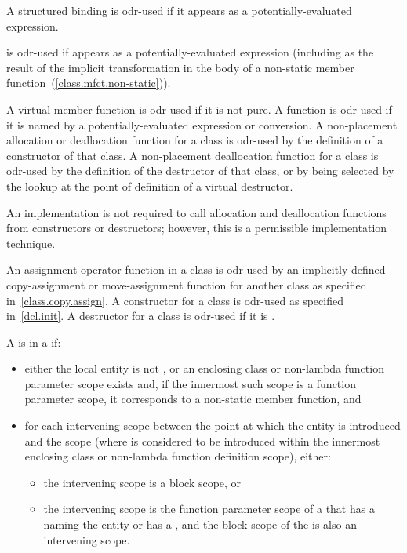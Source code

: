 \pnum
A structured binding is odr-used if it appears as a potentially-evaluated expression.

\pnum
{} is odr-used if  appears as a potentially-evaluated expression
(including as the result of the implicit transformation in the body of a non-static
member function~(\ref{class.mfct.non-static})).

\pnum
A virtual member
function is odr-used if it is not pure.
A function is odr-used if it is named by
a potentially-evaluated expression or conversion.
A non-placement allocation or deallocation
function for a class is odr-used by the definition of a constructor of that
class. A non-placement deallocation function for a class is odr-used by the
definition of the destructor of that class, or by being selected by the
lookup at the point of definition of a virtual
destructor.
\begin{footnote}
An implementation is not required
to call allocation and
deallocation functions from constructors or destructors; however, this
is a permissible implementation technique.
\end{footnote}

\pnum
An assignment operator function in a class is odr-used by an
implicitly-defined
copy-assignment or move-assignment function for another class as specified
in~\ref{class.copy.assign}.
A constructor for a class is odr-used as specified
in~\ref{dcl.init}. A destructor for a class is odr-used if it is
.

\pnum
A 
is  in a  if:
\begin{itemize}
\item either the local entity is not , or
an enclosing class or non-lambda function parameter scope exists and,
if the innermost such scope is a function parameter scope,
it corresponds to a non-static member function, and
\item
for each intervening scope
between the point at which the entity is introduced and the scope
(where  is considered to be introduced
within the innermost enclosing class or non-lambda function definition scope),
either:
\begin{itemize}
\item the intervening scope is a block scope, or
\item the intervening scope is the function parameter scope of a 
that has a 
naming the entity or has a , and
the block scope of the 
is also an intervening scope.
\end{itemize}
\end{itemize}

